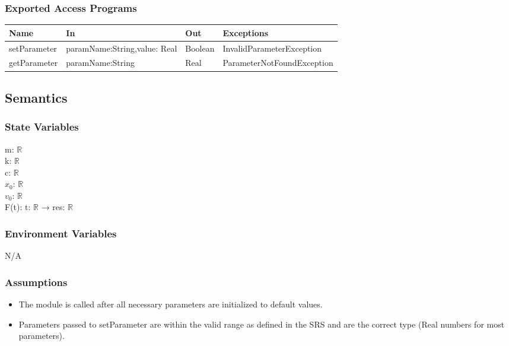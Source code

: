 \documentclass[12pt, titlepage]{article}
\begin{document}
\subsubsection{Exported Access Programs}

\begin{center}
\begin{tabular}{p{3cm} p{5cm} p{2cm} p{5cm}}
\hline
\textbf{Name} & \textbf{In} & \textbf{Out} & \textbf{Exceptions} \\
\hline
setParameter & paramName:String,value: Real & Boolean & InvalidParameterException \\
getParameter & paramName:String & Real & ParameterNotFoundException \\
\hline
\end{tabular}
\end{center}

\subsection{Semantics}

\subsubsection{State Variables}
m: $\mathbb{R}$\\
k: $\mathbb{R}$\\
c: $\mathbb{R}$\\
$x_0$: $\mathbb{R}$\\
$v_0$: $\mathbb{R}$\\
F(t): t: $\mathbb{R}$ → res: $\mathbb{R}$ %

\subsubsection{Environment Variables}

N/A

\subsubsection{Assumptions}

\begin{itemize}
  \item The module is called after all necessary parameters are initialized to default values.
  \item Parameters passed to setParameter are within the valid range as defined in the SRS and are the correct type (Real numbers for most parameters).
\end{itemize}
\end{document}
